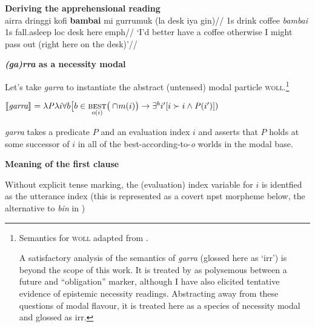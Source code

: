 \pex{}\textbf{Deriving the apprehensional reading}\\
\begingl
\gla ai\textdblhyphen{}rra dringgi kofi \textbf{bambai} mi gurrumuk (la desk iya gin)//
\glb 1s drink coffee \textit{bambai} 1s fall.asleep {\sc loc} desk here {\sc emph}//
\glft `I'd better have a coffee otherwise I might pass out (right here on the desk)'\trailingcitation{[GT~28052016]}//\endgl

\a \textbf{\textit{(ga)rra} as a necessity modal}

Let's take \textit{garra} to instantiate the abstract (untensed) modal particle \textsc{woll}.\footnote{Semantics for \textsc{woll} adapted from \citet[71]{Condoravdi2002}.
	
	A satisfactory analysis of the semantics of \textit{garra} (glossed here as `\gls{irr}') is beyond the scope of this work. It is treated by \cite{Schultze-Berndt} as polysemous between a future and ``obligation'' marker, although I have also elicited tentative evidence of epistemic necessity readings. Abstracting away from these questions of modal flavour, it is treated here as a species of necessity modal and glossed as \gls{irr}.}

$ \llbracket{\textit{garra}}\rrbracket^{} =\lambda\mathit P\lambda i\forall b\big[b\in\underset{o(i)}{\textsc{best}}\big(\cap\!m(i)\big)\to\exists ^bi'[i\succ i\wedge\mathit P(i')])$

\textit{garra} takes a predicate $ \textit{P} $ and an evaluation index $ i $ and asserts that $ \textit{P} $ holds at some successor of $ i $ in all of the best-according-to-\textit{o} worlds in the modal base.



\a \textbf{Meaning of the first clause} 

Without explicit tense marking, the (evaluation) index variable for $ i $ is identfied as the utterance index (this is represented as a covert \gls{npst} morpheme below, the alternative to \textit{bin} in )


